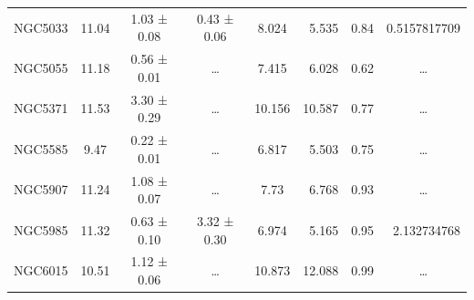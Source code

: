 \documentclass[reprint,%
 amsmath,amssymb,
 aps,
]{revtex4-1}
\begin{document}
\begin{table}[]
\begin{tabular}{cccccrrc}
\rowcolor[HTML]{F3F3F3} 
NGC5033              & 11.04                     & 1.03 ± 0.08           & 0.43 ± 0.06            & 8.024                                                        & 5.535                                                          & 0.84                                                           & \multicolumn{1}{r}{\cellcolor[HTML]{F3F3F3}0.5157817709}      \\
\rowcolor[HTML]{F3F3F3} 
NGC5055              & 11.18                     & 0.56 ± 0.01           & …                      & 7.415                                                        & 6.028                                                           & 0.62                                                          & …                                                             \\
\rowcolor[HTML]{F3F3F3} 
NGC5371              & 11.53                     & 3.30 ± 0.29           & …                      & 10.156                                                       & 10.587                                                           & 0.77                                                          & …                                                             \\
\rowcolor[HTML]{F3F3F3} 
NGC5585              & 9.47                      & 0.22 ± 0.01           & …                      & 6.817                                                        & 5.503                                                           & 0.75                                                           & …                                                             \\
\rowcolor[HTML]{F3F3F3} 
NGC5907              & 11.24                     & 1.08 ± 0.07           & …                      & 7.73                                                         & 6.768                                                          & 0.93                                                          & …                                                             \\
\rowcolor[HTML]{F3F3F3} 
NGC5985              & 11.32                     & 0.63 ± 0.10           & 3.32 ± 0.30            & 6.974                                                        & 5.165                                                           & 0.95                                                           & \multicolumn{1}{r}{\cellcolor[HTML]{F3F3F3}2.132734768}       \\
\rowcolor[HTML]{F3F3F3} 
NGC6015              & 10.51                     & 1.12 ± 0.06           & …                      & 10.873                                                       & 12.088                                                           & 0.99                                                           & …                                                             \\

\end{tabular}
\end{table}
\end{document}
